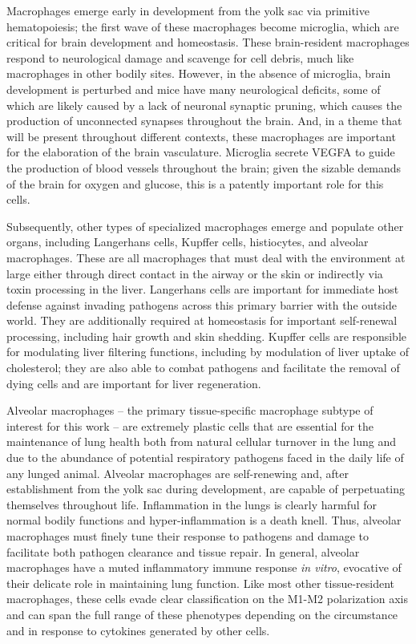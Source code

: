 Macrophages emerge early in development from the yolk sac via primitive hematopoiesis; the first wave of these macrophages become microglia, which are critical for brain development and homeostasis. These brain-resident macrophages respond to neurological damage and scavenge for cell debris, much like macrophages in other bodily sites. However, in the absence of microglia, brain development is perturbed and mice have many neurological deficits, some of which are likely caused by a lack of neuronal synaptic pruning, which causes the production of unconnected synapses throughout the brain. And, in a theme that will be present throughout different contexts, these macrophages are important for the elaboration of the brain vasculature. Microglia secrete VEGFA to guide the production of blood vessels throughout the brain; given the sizable demands of the brain for oxygen and glucose, this is a patently important role for this cells. 

Subsequently, other types of specialized macrophages emerge and populate other organs, including Langerhans cells, Kupffer cells, histiocytes, and alveolar macrophages. These are all macrophages that must deal with the environment at large either through direct contact in the airway or the skin or indirectly via toxin processing in the liver. Langerhans cells are important for immediate host defense against invading pathogens across this primary barrier with the outside world. They are additionally required at homeostasis for important self-renewal processing, including hair growth and skin shedding. Kupffer cells are responsible for modulating liver filtering functions, including by modulation of liver uptake of cholesterol; they are also able to combat pathogens and facilitate the removal of dying cells and are important for liver regeneration. 

Alveolar macrophages -- the primary tissue-specific macrophage subtype of interest for this work -- are extremely plastic cells that are essential for the maintenance of lung health both from natural cellular turnover in the lung and due to the abundance of potential respiratory pathogens faced in the daily life of any lunged animal. Alveolar macrophages are self-renewing and, after establishment from the yolk sac during development, are capable of perpetuating themselves throughout life. Inflammation in the lungs is clearly harmful for normal bodily functions and hyper-inflammation is a death knell. Thus, alveolar macrophages must finely tune their response to pathogens and damage to facilitate both pathogen clearance and tissue repair. In general, alveolar macrophages have a muted inflammatory immune response \textit{in vitro}, evocative of their delicate role in maintaining lung function. Like most other tissue-resident macrophages, these cells evade clear classification on the M1-M2 polarization axis and can span the full range of these phenotypes depending on the circumstance and in response to cytokines generated by other cells. 

